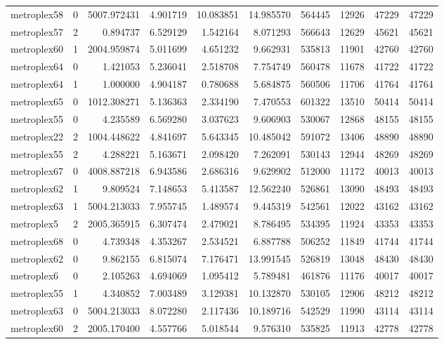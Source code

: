 \begin{longtable}{|l|r|r|r|r|r|r|r|r|r|}
metroplex58 & 0 & 5007.972431 & 4.901719 & 10.083851 & 14.985570 & 564445 & 12926 & 47229 & 47229 \\
metroplex57 & 2 & 0.894737 & 6.529129 & 1.542164 & 8.071293 & 566643 & 12629 & 45621 & 45621 \\
metroplex60 & 1 & 2004.959874 & 5.011699 & 4.651232 & 9.662931 & 535813 & 11901 & 42760 & 42760 \\
metroplex64 & 0 & 1.421053 & 5.236041 & 2.518708 & 7.754749 & 560478 & 11678 & 41722 & 41722 \\
metroplex64 & 1 & 1.000000 & 4.904187 & 0.780688 & 5.684875 & 560506 & 11706 & 41764 & 41764 \\
metroplex65 & 0 & 1012.308271 & 5.136363 & 2.334190 & 7.470553 & 601322 & 13510 & 50414 & 50414 \\
metroplex55 & 0 & 4.235589 & 6.569280 & 3.037623 & 9.606903 & 530067 & 12868 & 48155 & 48155 \\
metroplex22 & 2 & 1004.448622 & 4.841697 & 5.643345 & 10.485042 & 591072 & 13406 & 48890 & 48890 \\
metroplex55 & 2 & 4.288221 & 5.163671 & 2.098420 & 7.262091 & 530143 & 12944 & 48269 & 48269 \\
metroplex67 & 0 & 4008.887218 & 6.943586 & 2.686316 & 9.629902 & 512000 & 11172 & 40013 & 40013 \\
metroplex62 & 1 & 9.809524 & 7.148653 & 5.413587 & 12.562240 & 526861 & 13090 & 48493 & 48493 \\
metroplex63 & 1 & 5004.213033 & 7.955745 & 1.489574 & 9.445319 & 542561 & 12022 & 43162 & 43162 \\
metroplex5 & 2 & 2005.365915 & 6.307474 & 2.479021 & 8.786495 & 534395 & 11924 & 43353 & 43353 \\
metroplex68 & 0 & 4.739348 & 4.353267 & 2.534521 & 6.887788 & 506252 & 11849 & 41744 & 41744 \\
metroplex62 & 0 & 9.862155 & 6.815074 & 7.176471 & 13.991545 & 526819 & 13048 & 48430 & 48430 \\
metroplex6 & 0 & 2.105263 & 4.694069 & 1.095412 & 5.789481 & 461876 & 11176 & 40017 & 40017 \\
metroplex55 & 1 & 4.340852 & 7.003489 & 3.129381 & 10.132870 & 530105 & 12906 & 48212 & 48212 \\
metroplex63 & 0 & 5004.213033 & 8.072280 & 2.117436 & 10.189716 & 542529 & 11990 & 43114 & 43114 \\
metroplex60 & 2 & 2005.170400 & 4.557766 & 5.018544 & 9.576310 & 535825 & 11913 & 42778 & 42778 \\

\end{longtable}
